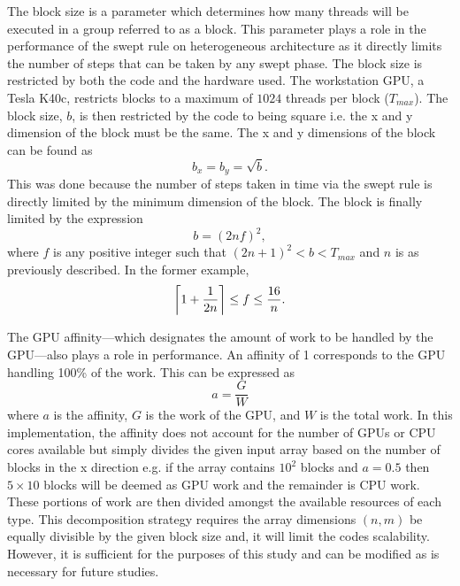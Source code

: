 \documentclass[review]{elsarticle}
\DeclarePairedDelimiter{\ceil}{\lceil}{\rceil}
\begin{document}
\par
The block size is a parameter which determines how many threads will be executed in a group referred to as a block. This parameter plays a role in the performance of the swept rule on heterogeneous architecture as it directly limits the number of steps that can be taken by any swept phase. The block size is restricted by both the code and the hardware used. The workstation GPU, a Tesla K40c, restricts blocks to a maximum of $1024$ threads per block ($T_{max}$).
The block size, $b$, is then restricted by the code to being square i.e. the x and y dimension of the block must be the same. The x and y dimensions of the block can be found as
\begin{equation}
    b_x = b_y = \sqrt{b}.
\end{equation}
This was done because the number of steps taken in time via the swept rule is directly limited by the minimum dimension of the block. The block is finally limited by the expression
\begin{equation}
    b  = (2nf)^2,
\end{equation}
where $f$ is any positive integer such that $(2n+1)^2 < b < T_{max}$ and $n$ is as previously described. In the former example,
\begin{equation}
  \ceil[\bigg]{1+\frac{1}{2n}} \leq f \leq \frac{16}{n}.
\end{equation}

\par
The GPU affinity---which designates the amount of work to be handled by the GPU---also plays a role in performance. An affinity of 1 corresponds to the GPU handling 100\% of the work. This can be expressed as
\begin{equation}
    a = \frac{G}{W}
\end{equation}
where $a$ is the affinity, $G$ is the work of the GPU, and $W$ is the total work. In this implementation, the affinity does not account for the number of GPUs or CPU cores available but simply divides the given input array based on the number of blocks in the x direction e.g. if the array contains $10^2$ blocks and $a=0.5$ then $5\times10$ blocks will be deemed as GPU work and the remainder is CPU work. These portions of work are then divided amongst the available resources of each type. This decomposition strategy requires the array dimensions $(n, m)$ be equally divisible by the given block size and, it will limit the codes scalability. However, it is sufficient for the purposes of this study and can be modified as is necessary for future studies. 
\end{document}
